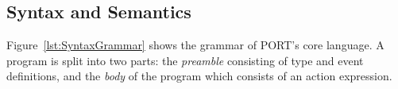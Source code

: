 %
%
%
%
%
%
%


\subsection{Syntax and Semantics}
\label{sub:SyntaxAndSemantics}

Figure~\ref{lst:SyntaxGrammar} shows the grammar of PORT's core language.
A program is split into two parts: the \emph{preamble} consisting of type and event definitions, and the \emph{body} of the program which consists of an action expression. 


